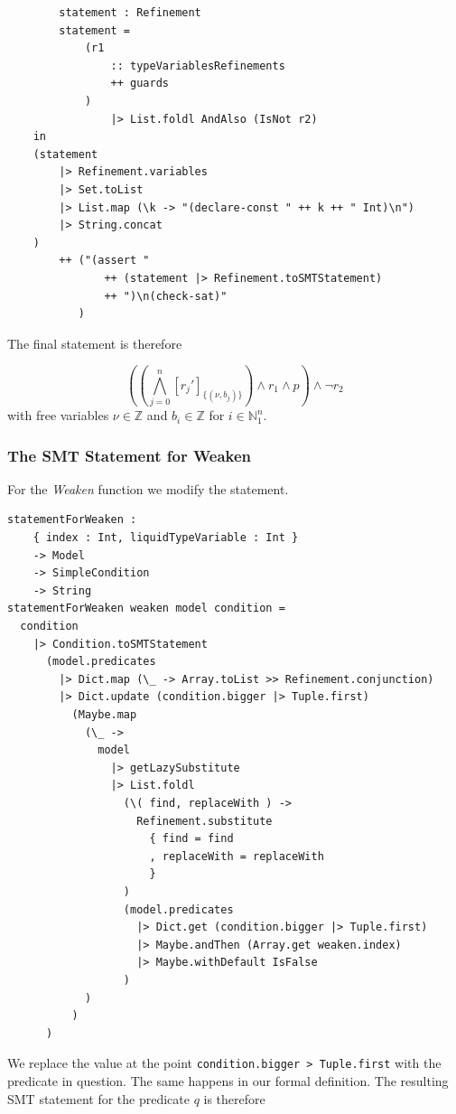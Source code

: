 \documentclass[]{scrbook}
\theoremstyle{definition}
\theoremstyle{definition}
\theoremstyle{definition}
\theoremstyle{remark}
\begin{document}
\text{\textemdash}

\begin{verbatim}
        statement : Refinement
        statement =
            (r1
                :: typeVariablesRefinements
                ++ guards
            )
                |> List.foldl AndAlso (IsNot r2)
    in
    (statement
        |> Refinement.variables
        |> Set.toList
        |> List.map (\k -> "(declare-const " ++ k ++ " Int)\n")
        |> String.concat
    )
        ++ ("(assert " 
               ++ (statement |> Refinement.toSMTStatement) 
               ++ ")\n(check-sat)"
           )
\end{verbatim}

The final statement is therefore

\[((\bigwedge_{j=0}^n [r_j']_{\{(\nu,b_j)\}})\land r_1\land p)\land \neg r_2\]
with free variables \(\nu\in\mathbb{Z}\) and \(b_i\in\mathbb{Z}\) for
\(i\in\mathbb{N}_1^n\).

\subsubsection{The SMT Statement for
Weaken}\label{the-smt-statement-for-weaken}

For the \emph{Weaken} function we modify the statement.

\begin{verbatim}
statementForWeaken :
    { index : Int, liquidTypeVariable : Int }
    -> Model
    -> SimpleCondition
    -> String
statementForWeaken weaken model condition =
  condition
    |> Condition.toSMTStatement
      (model.predicates
        |> Dict.map (\_ -> Array.toList >> Refinement.conjunction)
        |> Dict.update (condition.bigger |> Tuple.first)
          (Maybe.map
            (\_ ->
              model
                |> getLazySubstitute
                |> List.foldl
                  (\( find, replaceWith ) ->
                    Refinement.substitute
                      { find = find
                      , replaceWith = replaceWith
                      }
                  )
                  (model.predicates
                    |> Dict.get (condition.bigger |> Tuple.first)
                    |> Maybe.andThen (Array.get weaken.index)
                    |> Maybe.withDefault IsFalse
                  )
            )
          )
      )
\end{verbatim}

We replace the value at the point
\texttt{condition.bigger\ \textbar{}\textgreater{}\ Tuple.first} with
the predicate in question. The same happens in our formal definition.
The resulting SMT statement for the predicate \(q\) is therefore
\end{document}
